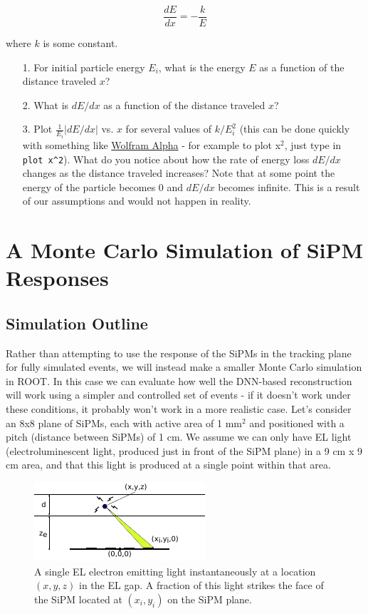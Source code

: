 \documentclass[10pt]{article}
\begin{document}
\begin{equation}
\frac{dE}{dx} = -\frac{k}{E}
\end{equation}

\noindent where $k$ is some constant.

\begin{enumerate}
	\item[1.] For initial particle energy $E_{i}$, what is the energy $E$ as a function of the distance traveled $x$?
	\item[2.] What is $dE/dx$ as a function of the distance traveled $x$?
	\item[3.] Plot $\frac{1}{E_i}|dE/dx|$ vs. $x$ for several values of $k/E_{i}^2$ (this can be done quickly with something like \href{https://www.wolframalpha.com/}{Wolfram Alpha} - for example to plot 
	x$^2$, just type in \verb|plot x^2|).  What do you notice about how the rate of energy loss $dE/dx$ changes as the distance traveled increases?  Note that at some
	point the energy of the particle becomes 0 and $dE/dx$ becomes infinite.  This is a result of our assumptions and would not happen in reality.
\end{enumerate}

\section{A Monte Carlo Simulation of SiPM Responses}
\subsection{Simulation Outline}
\noindent Rather than attempting to use the response of the SiPMs in the tracking plane for fully simulated events, we will instead make a smaller Monte Carlo simulation in ROOT.
In this case we can evaluate how well the DNN-based reconstruction will work using a simpler and controlled set of events - if it doesn't work under these conditions, it probably won't work in a 
more realistic case.  Let's consider an 8x8 plane of SiPMs, each with active area of 1 mm$^2$ and positioned with a pitch (distance between SiPMs) of 1 cm.  We assume we can only have
EL light (electroluminescent light, produced just in front of the SiPM plane) in a 9 cm x 9 cm area, and that this light is produced at a single point within that area.\\

\begin{figure}[!ht]
	\center
	\includegraphics[scale=2.5]{fig/el_sipm_theory.pdf}
	\caption[A single EL electron emitting light instantaneously at a location $(x,y,z)$ in the EL gap]{\label{fig:el_sipm_theory}A single EL electron 
		emitting light instantaneously at a location $(x,y,z)$ in
		the EL gap.  A fraction of this light strikes the face of the SiPM located at $(x_{i},y_{i})$ on the SiPM plane.}
\end{figure}
\end{document}
